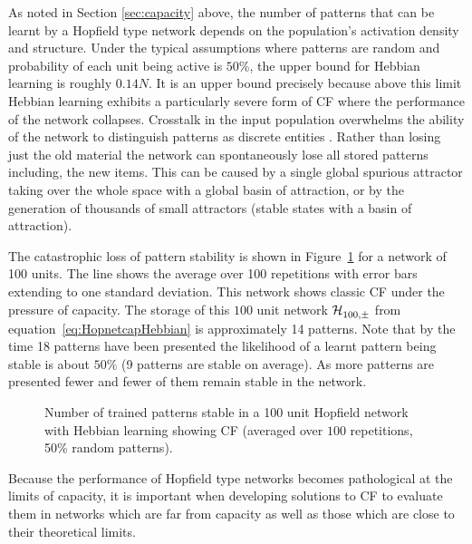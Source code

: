 As noted in Section \ref{sec:capacity} above, the number of patterns that can be learnt by a Hopfield type network depends on the population's activation density and structure.  Under the typical assumptions where patterns are random and probability of each unit being active is $50\%$, the upper bound for Hebbian learning is roughly $0.14N$. It is an upper bound precisely because above this limit Hebbian learning exhibits a particularly severe form of CF where the performance of the network collapses.  Crosstalk in the input population overwhelms the ability of the network to distinguish patterns as discrete entities .  Rather than losing just the old material the network can spontaneously lose all stored patterns including, the new items.  This can be caused by a single global spurious attractor taking over the whole space with a global basin of attraction, or by the generation of thousands of small attractors (stable states with a basin of attraction).  

The catastrophic loss of pattern stability is shown in Figure~\ref{fig:hebb64clean}  for a network of 100 units.  The line shows the average over 100 repetitions with error bars extending to one standard deviation. This network shows classic CF under the pressure of capacity.  The storage of this $100$ unit network \(\mathcal{H}_{100,\pm}^{}\) from equation~\ref{eq:HopnetcapHebbian} is approximately 14 patterns.  Note that by the time 18 patterns have been presented the likelihood of a learnt pattern being stable is about $50\%$ (9 patterns are stable on average).  As more patterns are presented fewer and fewer of them remain stable in the network.  

\begin{figure}[tbp]
\small
\center
	\begin{center}
%		
	\end{center}
	\caption{Number of trained patterns stable in a 100 unit Hopfield network  with Hebbian learning showing CF (averaged over $100$ repetitions, 50\% random patterns).}
	\label{fig:hebb64clean}
\end{figure}


Because the performance of Hopfield type networks becomes pathological at the limits of capacity, it is important when developing solutions to CF to evaluate them in networks which are far from capacity as well as those which are close to their theoretical limits.

